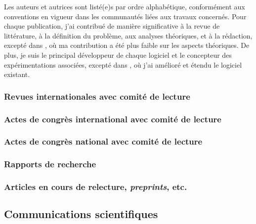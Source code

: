 \documentclass[12pt]{article}
\begin{document}
Les auteurs et autrices sont listé(e)s par ordre alphabétique, conformément aux conventions en
vigueur dans les communautés liées aux travaux concernés.  
Pour chaque publication, j'ai contribué de manière significative à la revue de littérature, à la
définition du problème, aux analyses théoriques, et à la rédaction, excepté dans \cite{canon2024b},
où ma contribution a été plus faible sur les aspects théoriques.  
De plus, je suis le principal développeur de chaque logiciel et le concepteur des expérimentations
associées, excepté dans \cite{canon2024b}, où j'ai amélioré et étendu le logiciel existant.

\newcommand{\showbib}[1]{%
    \begin{otherlanguage}{english}
        \printbibliography[heading=none,keyword={#1}]
    \end{otherlanguage}}

\subsubsection*{Revues internationales avec comité de lecture}

\showbib{journals}

\subsubsection*{Actes de congrès international avec comité de lecture}

\showbib{international proceedings}

\subsubsection*{Actes de congrès national avec comité de lecture}

\showbib{national proceedings}

\subsubsection*{Rapports de recherche}

\showbib{research report}

\subsubsection*{Articles en cours de relecture, \emph{preprints}, etc.}

\showbib{misc}

\subsection{Communications scientifiques}
\end{document}
